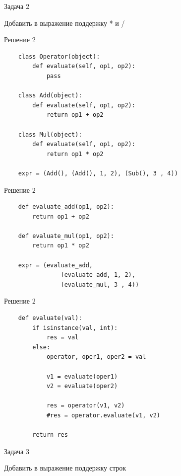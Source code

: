 \documentclass{article}
\begin{document}
\begin{center} Задача 2 \end{center}
    Добавить в выражение поддержку * и /
\newpage

\begin{center} Решение 2 \end{center}
\begin{lstlisting}
    class Operator(object):
        def evaluate(self, op1, op2):
            pass

    class Add(object):
        def evaluate(self, op1, op2):
            return op1 + op2

    class Mul(object):
        def evaluate(self, op1, op2):
            return op1 * op2

    expr = (Add(), (Add(), 1, 2), (Sub(), 3 , 4))
\end{lstlisting}
\newpage

\begin{center} Решение 2 \end{center}
\begin{lstlisting}
    def evaluate_add(op1, op2):
        return op1 + op2

    def evaluate_mul(op1, op2):
        return op1 * op2

    expr = (evaluate_add,
                (evaluate_add, 1, 2), 
                (evaluate_mul, 3 , 4))
\end{lstlisting}
\newpage

\begin{center} Решение 2 \end{center}
\begin{lstlisting}
    def evaluate(val):
        if isinstance(val, int):
            res = val
        else:
            operator, oper1, oper2 = val

            v1 = evaluate(oper1)
            v2 = evaluate(oper2)
            
            res = operator(v1, v2)
            #res = operator.evaluate(v1, v2)

        return res
\end{lstlisting}
\newpage

\begin{center} Задача 3 \end{center}
    Добавить в выражение поддержку строк
\newpage
\end{document}
